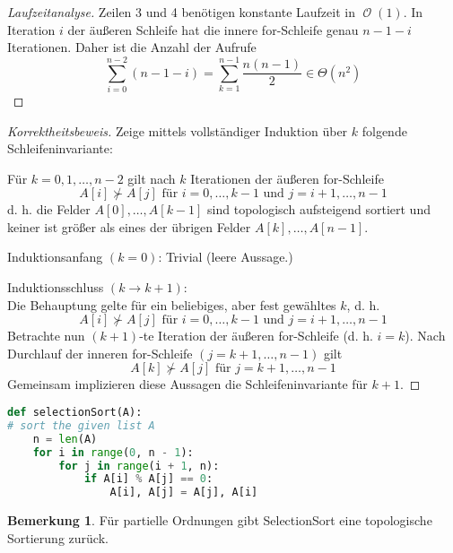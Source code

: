 \documentclass[a4paper,12pt]{article}
\DeclareMathOperator{\BigO}{\mathcal O}
\theoremstyle{definition}
\newtheorem*{bemerkung}{Bemerkung}
\begin{document}
	\setcounter{section}{8}
	\setcounter{subsection}{2}
	\begin{proof}[Laufzeitanalyse]
		Zeilen 3 und 4 benötigen konstante Laufzeit in $\BigO(1)$. In Iteration $i$ der äußeren Schleife hat die innere {\ttfamily for}-Schleife genau $n-1-i$ Iterationen. Daher ist die Anzahl der Aufrufe
		\[
			\sum_{i = 0}^{n - 2}(n - 1 - i) = \sum_{k = 1}^{n - 1}\frac{n(n - 1)}{2}\in \Theta(n^2)
		\]
	\end{proof}
	\begin{proof}[Korrektheitsbeweis]
		Zeige mittels vollständiger Induktion über $k$ folgende Schleifeninvariante:
		
		Für $k = 0, 1, \ldots, n - 2$ gilt nach $k$ Iterationen der äußeren {\ttfamily for}-Schleife
		\[
			A[i] \nsucc A[j] \text{ für } i = 0, \ldots, k - 1 \text{ und } j = i + 1, \ldots, n - 1
		\]
		d. h. die Felder $A[0], \ldots, A[k - 1]$ sind topologisch aufsteigend sortiert und keiner ist größer als eines der übrigen Felder $A[k], \ldots, A[n - 1]$.
		
		Induktionsanfang $(k = 0)$: Trivial (leere Aussage.)
		
		Induktionsschluss $(k \to k + 1)$:\\[2ex]
		Die Behauptung gelte für ein beliebiges, aber fest gewähltes $k$, d. h. 
		\[
			A[i] \nsucc A[j] \text{ für } i = 0, \ldots, k - 1 \text{ und } j = i + 1, \ldots, n - 1
		\]
		Betrachte nun $(k + 1)$-te Iteration der äußeren {\ttfamily for}-Schleife (d. h. $i = k$). Nach Durchlauf der inneren {\ttfamily for}-Schleife $(j = k + 1, \ldots, n - 1)$ gilt
		\[
			A[k] \nsucc A[j] \text{ für } j = k + 1, \ldots, n - 1
		\]
		Gemeinsam implizieren diese Aussagen die Schleifeninvariante für $k + 1$.
	\end{proof}
	\begin{lstlisting}[language=Python]
def selectionSort(A):
# sort the given list A
	n = len(A)
	for i in range(0, n - 1):
		for j in range(i + 1, n):
			if A[i] % A[j] == 0:
				A[i], A[j] = A[j], A[i]\end{lstlisting}
	\begin{bemerkung}
		Für partielle Ordnungen gibt SelectionSort eine topologische Sortierung zurück.
	\end{bemerkung}
\end{document}
